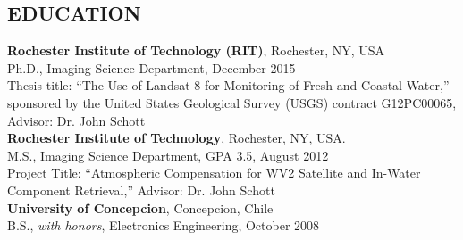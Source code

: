 \documentclass[11pt]{res} %
\begin{document}
\begin{resume}  
\vspace{-0.3in}                                         
\section{EDUCATION}
\vspace{0.1in}
{\bf Rochester Institute of Technology (RIT)}, Rochester, NY, USA\\
Ph.D., Imaging Science Department, December 2015\\
Thesis title: ``The Use of Landsat-8 for Monitoring of Fresh and Coastal Water,'' sponsored by the United States Geological Survey (USGS) contract G12PC00065, Advisor: Dr. John Schott
\vspace{0.1in}\\
{\bf Rochester Institute of Technology}, Rochester, NY, USA.\\
M.S., Imaging Science Department, GPA 3.5, August 2012\\
Project Title: ``Atmospheric Compensation for WV2 Satellite and In-Water Component Retrieval,'' Advisor: Dr. John Schott
\vspace{0.1in}\\
{\bf University of Concepcion}, Concepcion, Chile \\
B.S., {\it with honors}, Electronics Engineering, October 2008\\

\vspace{-0.2in}

\end{resume}
\end{document}
